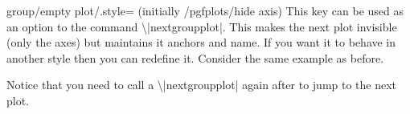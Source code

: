 \begin{pgfplotskey}{group/empty plot/.style= (initially /pgfplots/hide axis)}
  This key can be used as an option to the command \textbackslash|nextgroupplot|. This makes the next plot invisible (only the axes) but maintains it anchors and
  name. If you want it to behave in another style then you can redefine it. Consider the same example as before.
\begin{codeexample}[]
\end{codeexample}
Notice that you need to call a \textbackslash|nextgroupplot| again after to jump to the next plot. 
\end{pgfplotskey}
